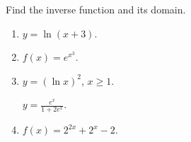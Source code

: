 Find the inverse function and its domain. 
\begin{multicols}{2}
\begin{enumerate}[ref={\fcProblemRef}]
\item  \label{problemFindInversey=ln(x+3)} $\displaystyle y=\ln (x+3)$.

\item  $f(x)=e^{x^3}$.

\item \label{problemFindInversey=(lnx)^2} $\displaystyle y=(\ln x)^2$, $x\geq 1$.

 \label{problemFindInversey=e^x/(1+2e^x)}  $\displaystyle y=\frac{e^x}{1+2e^x}$.

\item \label{problemFindInversef=2^(2x)+2^x-2} $f(x)=2^{2x}+2^{x}-2$.

\end{enumerate}
\end{multicols}
